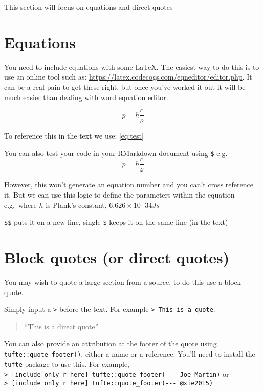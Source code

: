 \documentclass[
  12pt,
  oneside]{book}
\begin{document}
This section will focus on equations and direct quotes

\section{Equations}\label{equations}

You need to include equations with some LaTeX. The easiest way to do this is to use an online tool such as: \url{https://latex.codecogs.com/eqneditor/editor.php}. It can be a real pain to get these right, but once you've worked it out it will be much easier than dealing with word equation editor.

\begin{equation} 
  p= h\frac{c}{\varrho}
  \label{eq:test}
\end{equation}

To reference this in the text we use: \eqref{eq:test}

You can also test your code in your RMarkdown document using \texttt{\$} e.g.~\[p= h\frac{c}{\varrho}\]

However, this won't generate an equation number and you can't cross reference it. But we can use this logic to define the parameters within the equation e.g.~where \(h\) is Plank's constant, \(6.626 × 10^-34 Js\)

\texttt{\$\$} puts it on a new line, single \texttt{\$} keeps it on the same line (in the text)

\section{Block quotes (or direct quotes)}\label{quotes}

You may wish to quote a large section from a source, to do this use a block quote.

Simply input a \texttt{\textgreater{}} before the text. For example \texttt{\textgreater{}\ This\ is\ a\ quote}.

\begin{quote}
``This is a direct quote''
\end{quote}

You can also provide an attribution at the footer of the quote using \texttt{tufte::quote\_footer()}, either a name or a reference. You'll need to install the \texttt{tufte} package to use this. For example, \texttt{\textgreater{}\ {[}include\ only\ r\ here{]}\ tufte::quote\_footer(\textquotesingle{}-\/-\/-\ Joe\ Martin\textquotesingle{})} or \texttt{\textgreater{}\ {[}include\ only\ r\ here{]}\ tufte::quote\_footer(\textquotesingle{}-\/-\/-\ @xie2015\textquotesingle{})}
\end{document}
